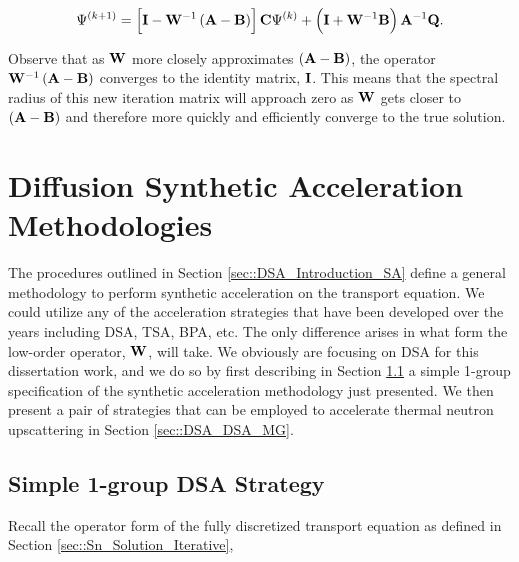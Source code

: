 \begin{equation}
\label{eq::DSA_synthetic_eq_new_algo}
\Psi^{(k+1)} = \left[  {\bf I} - {\bf W}^{-1} \left(  {\bf A} - {\bf B}  \right)  \right] {\bf C} \Psi^{(k)} + \left({\bf I} + {\bf W}^{-1} {\bf B} \right) {\bf A}^{-1} {\bf Q} .
\end{equation}

\noindent Observe that as ${\bf W}$ more closely approximates $\left(  {\bf A} - {\bf B}  \right)$, the operator ${\bf W}^{-1} \left(  {\bf A} - {\bf B}  \right)$ converges to the identity matrix, ${\bf I}$. This means that the spectral radius of this new iteration matrix will approach zero as ${\bf W}$ gets closer to $\left(  {\bf A} - {\bf B}  \right)$ and therefore more quickly and efficiently converge to the true solution.

\section{Diffusion Synthetic Acceleration Methodologies}
\label{sec::DSA_DSA}

The procedures outlined in Section \ref{sec::DSA_Introduction_SA} define a general methodology to perform synthetic acceleration on the transport equation. We could utilize any of the acceleration strategies that have been developed over the years including DSA, TSA, BPA, etc. The only difference arises in what form the low-order operator, ${\bf W}$, will take. We obviously are focusing on DSA for this dissertation work, and we do so by first describing in Section \ref{sec::DSA_DSA_1G} a simple 1-group specification of the synthetic acceleration methodology just presented. We then present a pair of strategies that can be employed to accelerate thermal neutron upscattering in Section \ref{sec::DSA_DSA_MG}.

\subsection{Simple 1-group DSA Strategy}
\label{sec::DSA_DSA_1G}



Recall the operator form of the fully discretized transport equation as defined in Section \ref{sec::Sn_Solution_Iterative},

